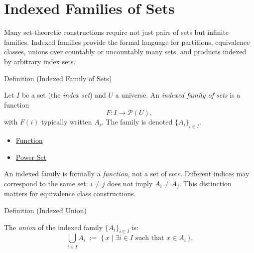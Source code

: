 
\section{Indexed Families of Sets}


\begin{remark*}[Motivation]
Many set-theoretic constructions require not just pairs of sets but
infinite families. Indexed families provide the formal language for
partitions, equivalence classes, unions over countably or uncountably many
sets, and products indexed by arbitrary index sets.
\end{remark*}

\begin{definitionbox}{Definition (Indexed Family of Sets)}
\begin{definition}\label{def:indexed-family}
Let $I$ be a set (the \emph{index set}) and $U$ a universe. An
\emph{indexed family of sets} is a function
\[
F : I \to \mathcal{P}(U),
\]
with $F(i)$ typically written $A_i$. The family is denoted $\{A_i\}_{i \in I}$.
\end{definition}
\end{definitionbox}

\begin{dependencies}
\begin{itemize}
  \item \hyperref[def:function]{Function}
  \item \hyperref[def:power-set]{Power Set}
\end{itemize}
\end{dependencies}

\begin{remark*}
An indexed family is formally a \emph{function}, not a set of sets.
Different indices may correspond to the same set: $i \neq j$ does not imply
$A_i \neq A_j$. This distinction matters for equivalence class constructions.
\end{remark*}

\begin{definitionbox}{Definition (Indexed Union)}
\begin{definition}\label{def:indexed-union}
The \emph{union} of the indexed family $\{A_i\}_{i \in I}$ is:
\[
\bigcup_{i \in I} A_i
\;:=\;
\{\, x \mid \exists i \in I \text{ such that } x \in A_i \,\}.
\]
\end{definition}
\end{definitionbox}

